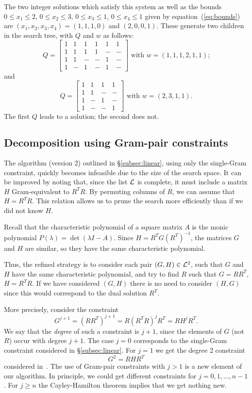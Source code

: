 \documentclass[11pt,a4paper]{article}
\newcommand{\ben}{\begin{equation*}}
\newcommand{\een}{\end{equation*}}
\begin{document}
The two integer
solutions which satisfy this system as well as the bounds
$0 \le x_1 \le 2$, $0 \le x_2 \le 3$, $0 \le x_3 \le 1$, $0 \le x_4 \le 1$ 
given by equation~(\ref{eq:bounds}) are
$(x_1,x_2,x_3,x_4) = (1,1,1,0)$ and $(2,0,0,1)$.
These generate two children in the search tree, with $Q$ and $w$ as follows:
\ben
Q =
\left [
\begin{matrix}
1 & 1 & 1 & 1 & 1 & 1\\
1 & 1 & 1 & 1 & - & -\\
1 & 1 & - & - & 1 & -\\
1 & - & 1 & - & 1 & -
\end{matrix}
\right ]
\text{ with $w=(1,1,1,2,1,1)$;}
\een
and
\ben
Q =
\left [
\begin{matrix}
1 & 1 & 1 & 1\\
1 & 1 & - & -\\
1 & - & 1 & -\\
1 & - & - & 1
\end{matrix}
\right ]
\text{ with $w=(2,3,1,1)$.}
\een
The first $Q$ leads to a solution; the second does not.

\subsection{Decomposition using Gram-pair constraints}
\label{subsec:nonlinear}

The algorithm (version 2) outlined in \S\ref{subsec:linear}, 
using only the single-Gram constraint, 
quickly becomes infeasible due to the size of the
search space.  
It can be improved by noting that, since the list $\cal L$
is complete, it must include a matrix $H$ Gram-equivalent to $R^TR$.  By 
permuting columns of $R$,
we can assume that $H = R^TR$.  This relation allows us
to prune the search more efficiently than if we did not know $H$.

Recall that the characteristic polynomial of a
square matrix $A$ is the monic polynomial 
$P(\lambda) = \det(\lambda I - A)$.
Since $H = R^TG(R^T)^{-1}$, the matrices $G$ and $H$ are similar, 
so they have the same characteristic polynomial.

Thus, the refined strategy is to consider each pair 
$(G,H) \in {\cal L}^2$, such that $G$ and $H$ have the same characteristic
polynomial, and try to find $R$ such that
$G = RR^T$, $H = R^TR$.  If we have considered $(G,H)$ there is 
no need to consider $(H,G)$ since this would correspond to the dual solution
$R^T$.

More precisely, consider the constraint
\begin{equation}
G^{j+1} = (RR^T)^{j+1} = R(R^TR)^jR^T = RH^jR^T. \label{eq:nonlinear}
\end{equation}
We say that the \emph{degree} of such a constraint is $j+1$, since the
elements of $G$ (not $R$) occur with degree $j+1$.
The case $j = 0$ corresponds to the single-Gram constraint considered
in \S\ref{subsec:linear}.  For $j = 1$ we get the degree 2 constraint
\[G^2 = RHR^T\]
considered in~\cite{Orrick05}.  
The use of Gram-pair constraints with $j>1$ is a new element of our algorithm.  In principle, we could
get different constraints for $j = 0, 1, \ldots, n-1$. For $j \ge n$ the
Cayley-Hamilton theorem implies that we get nothing new.
\end{document}
